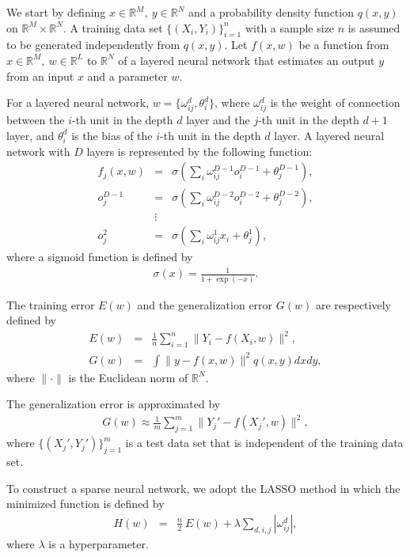 \documentclass[12pt]{article} %
\begin{document}
We start by defining $x\in \mathbb{R}^M,\ y\in \mathbb{R}^N$ and a probability density function $q(x,y)$ on $\mathbb{R}^M\times \mathbb{R}^N$. A training data set $\{(X_i,Y_i)\}_{i=1}^n$ with a sample size $n$ is assumed to be generated independently from $q(x,y)$. Let $f(x,w)$ be a function from $x\in \mathbb{R}^M,\ w\in \mathbb{R}^L$ to $\mathbb{R}^N$ of a layered neural network that estimates an output $y$ from an input $x$ and a parameter $w$. 

For a layered neural network, $w=\{\omega^d_{ij}, \theta^d_i\}$, where $\omega^d_{ij}$ is the weight of connection between the $i$-th unit in the depth $d$ layer and the $j$-th unit in the depth $d+1$ layer, and $\theta^d_i$ is the bias of the $i$-th unit in the depth $d$ layer. A layered neural network with $D$ layers is represented by the following function: 
\begin{eqnarray*}
  f_j(x,w) &=& \sigma(\sum_i \omega^{D-1}_{ij} o^{D-1}_i+\theta^{D-1}_j),\\
  o^{D-1}_j &=& \sigma(\sum_i \omega^{D-2}_{ij} o^{D-2}_i+\theta^{D-2}_j),\\
  &\vdots& \\
  o^2_j &=& \sigma(\sum_i \omega^1_{ij} x_i +\theta^1_j),
\end{eqnarray*}
where a sigmoid function is defined by
\begin{eqnarray*}
  \sigma (x)=\frac{1}{1+\exp (-x)}.
\end{eqnarray*}

The training error $E(w)$ and the generalization error $G(w)$ are respectively defined by
\begin{eqnarray*}
  E(w) &=& \frac{1}{n} \sum_{i=1}^n \|Y_i-f(X_i,w)\|^2,\\
  G(w) &=& \int \|y-f(x,w)\|^2 q(x,y)dxdy,
\end{eqnarray*}
where $\|\cdot\|$ is the Euclidean norm of $\mathbb{R}^N$.

The generalization error is approximated by
\begin{eqnarray*}
  G(w)\approx \frac{1}{m} \sum_{j=1}^m \|{Y_j}'-f({X_j}',w)\|^2,
\end{eqnarray*}
where $\{({X_j}', {Y_j}')\}_{j=1}^m$ is a test data set that is independent of the training data set.

To construct a sparse neural network, we adopt the LASSO method \cite{Ishikawa1990,Tibshirani1994} in which the minimized function is defined by
\begin{eqnarray*}
  H(w) &=& \frac{n}{2}\ E(w)+\lambda \sum_{d,i,j} |\omega^d_{ij}|,
\end{eqnarray*}
where $\lambda$ is a hyperparameter.
\end{document}
